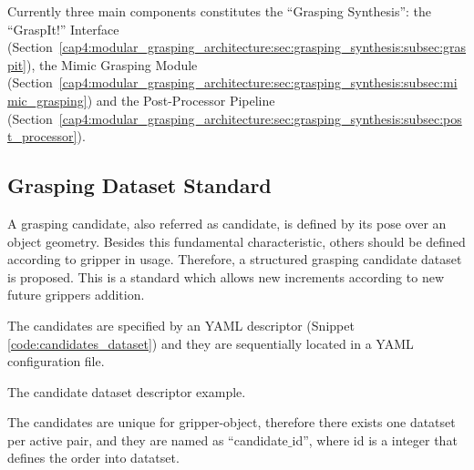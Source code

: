 Currently three main components constitutes the ``Grasping Synthesis'': the ``GraspIt!'' Interface (Section~\ref{cap4:modular_grasping_architecture:sec:grasping_synthesis:subsec:graspit}), the Mimic Grasping Module (Section~\ref{cap4:modular_grasping_architecture:sec:grasping_synthesis:subsec:mimic_grasping}) and the Post-Processor Pipeline (Section~\ref{cap4:modular_grasping_architecture:sec:grasping_synthesis:subsec:post_processor}). 

\subsection{Grasping Dataset Standard}
\label{cap4:modular_grasping_architecture:sec:grasping_dataset}

A grasping candidate, also referred as candidate, is defined by its pose over an object geometry. Besides this fundamental characteristic, others should be defined according to gripper in usage. Therefore, a structured grasping candidate dataset is proposed. This is a standard which allows new increments according to new future grippers addition.

The candidates are specified by an YAML descriptor (Snippet \ref{code:candidates_dataset}) and they are sequentially located in a YAML configuration file. %

\begin{snippet}[h!]
	\centering
	\caption{The candidate dataset descriptor example.}
	\label{code:candidates_dataset}
\end{snippet}

The candidates are unique for gripper-object, therefore there exists one datatset per active pair, and they are named as ``candidate$\_$id'', where id is a integer that defines the order into datatset. 

